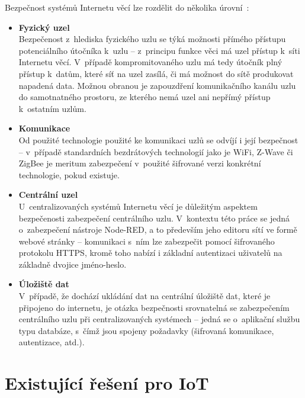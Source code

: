 Bezpečnost systémů Internetu věcí lze rozdělit do několika úrovní~\cite{IoTSecurity}:
\begin{itemize}
    \item \textbf{Fyzický uzel} \\
    Bezpečenost z~hlediska fyzického uzlu se týká možnosti přímého přístupu potenciálního útočníka k~uzlu --
z~principu funkce věci má uzel přístup k~síti Internetu věcí.
    V~případě kompromitovaného uzlu má tedy útočník plný přístup k~datům, které síť na uzel zasílá, či má možnost do
    sítě produkovat napadená data.
    Možnou obranou je zapouzdření komunikačního kanálu uzlu do samotnatného prostoru, ze kterého nemá uzel ani nepřímý
    přístup k~ostatním uzlům.

    \item \textbf{Komunikace} \\
    Od použité technologie použité ke komunikaci uzlů se odvíjí i její bezpečnost -- v~případě standardních
    bezdrátových technologií jako je WiFi, Z-Wave či ZigBee je meritum zabezpečení v~použité šifrované verzi
    konkrétní technologie, pokud existuje.

    \item \textbf{Centrální uzel} \\
    U~centralizovaných systémů Internetu věcí je důležitým aspektem bezpečenosti zabezpečení centrálního uzlu.
    V~kontextu této práce se jedná o~zabezpečení nástroje Node-RED, a to především jeho editoru
    sítí ve formě webové stránky -- komunikaci s~ním lze zabezpečit pomocí šifrovaného protokolu HTTPS, kromě toho
    nabízí i základní autentizaci uživatelů na základně dvojice jméno-heslo.

    \item \textbf{Úložiště dat} \\
    V~případě, že dochází ukládání dat na centrální úložiště dat, které je připojeno do internetu, je otázka
    bezpečnosti srovnatelná se zabezpečením centrálního uzlu při centralizovaných systémech -- jedná se o~aplikační
    službu typu databáze, s~čímž jsou spojeny požadavky (šifrovaná komunikace, autentizace, atd.).
\end{itemize}


\section{Existující řešení pro IoT}\label{sec:existujici-reseni}

